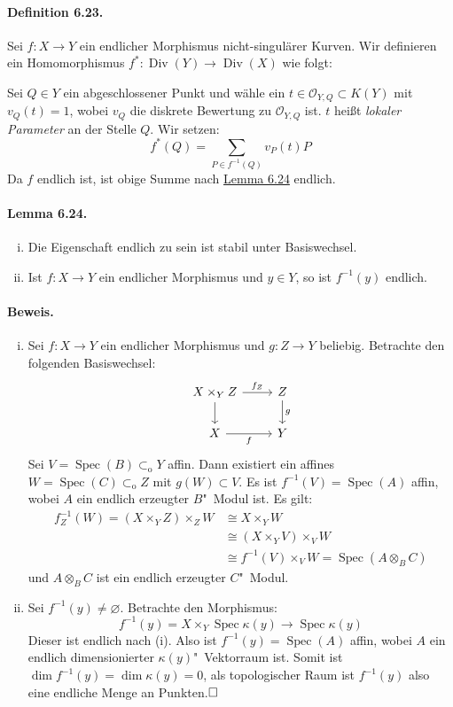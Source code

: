 \documentclass[11pt,b5paper,openany]{memoir}
\def \qed {$\hfill\square$}
\begin{document}
\paragraph{Definition 6.23.}\label{6.23} Sei $f:X\to Y$ ein endlicher Morphismus nicht-singulärer Kurven. Wir definieren ein Homomorphismus $f^\ast:\operatorname{Div}(Y)\to\operatorname{Div}(X)$ wie folgt:

Sei $Q\in Y$ ein abgeschlossener Punkt und wähle ein $t\in\mathcal{O}_{Y,Q}\subset K(Y)$ mit $v_Q(t)=1$, wobei $v_Q$ die diskrete Bewertung zu $\mathcal{O}_{Y,Q}$ ist. $t$ heißt \textit{lokaler Parameter} an der Stelle $Q$. Wir setzen:
\[f^\ast(Q) = \sum_{P\in f^{-1}(Q)}v_P(t)P \]
Da $f$ endlich ist, ist obige Summe nach \hyperref[6.24]{Lemma 6.24} endlich.

\paragraph{Lemma 6.24.}\label{6.24} \begin{enumerate}[(i)]
\item Die Eigenschaft endlich zu sein ist stabil unter Basiswechsel.
\item Ist $f:X\to Y$ ein endlicher Morphismus und $y\in Y$, so ist $f^{-1}(y)$ endlich.
\end{enumerate}

\paragraph{Beweis.} \begin{enumerate}[(i)]
\item Sei $f:X\to Y$ ein endlicher Morphismus und $g:Z\to Y$ beliebig. Betrachte den folgenden Basiswechsel:
\[\begin{tikzcd}
X\times_YZ \dar\rar["f_Z"] & Z\dar["g"]\\
X \rar["f"'] & Y
\end{tikzcd} \]
Sei $V=\operatorname{Spec}(B)\subset_\text{o}Y$ affin. Dann existiert ein affines $W=\operatorname{Spec}(C)\subset_\text{o}Z$ mit $g(W)\subset V$. Es ist $f^{-1}(V)=\operatorname{Spec}(A)$ affin, wobei $A$ ein endlich erzeugter $B$"~Modul ist. Es gilt:
\begin{align*}
f_Z^{-1}(W)= (X\times_YZ)\times_ZW &\cong X\times_YW \\
&\cong (X\times_YV)\times_VW\\
&\cong f^{-1}(V)\times_VW=\operatorname{Spec}(A\otimes_BC)
\end{align*}
und $A\otimes_BC$ ist ein endlich erzeugter $C$"~Modul.
\item Sei $f^{-1}(y)\neq\varnothing$. Betrachte den Morphismus:
\[f^{-1}(y)= X\times_Y\operatorname{Spec}\kappa(y)\to\operatorname{Spec}\kappa(y) \]
Dieser ist endlich nach (i). Also ist $f^{-1}(y)=\operatorname{Spec}(A)$ affin, wobei $A$ ein endlich dimensionierter $\kappa(y)$"~Vektorraum ist. Somit ist $\dim f^{-1}(y)=\dim\kappa(y)= 0$, als topologischer Raum ist $f^{-1}(y)$ also eine endliche Menge an Punkten.\qed
\end{enumerate}
\end{document}
